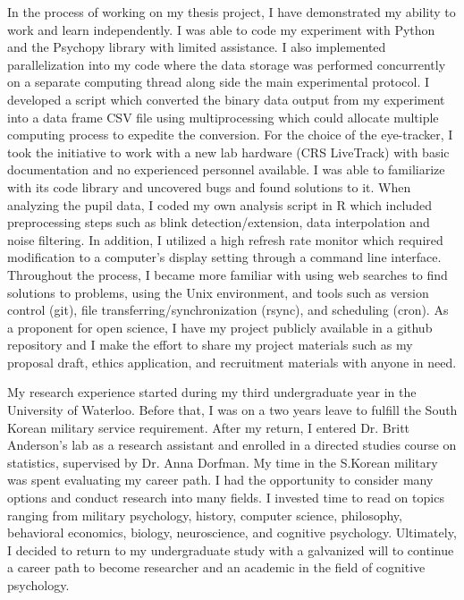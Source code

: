 In the process of working on my thesis project, I have demonstrated my ability to work and learn independently. I was able to code my experiment with Python and the Psychopy library with limited assistance. I also implemented parallelization into my code where the data storage was performed concurrently on a separate computing thread along side the main experimental protocol. I developed a script which converted the binary data output from my experiment into a data frame CSV file using multiprocessing which could allocate multiple computing process to expedite the conversion. For the choice of the eye-tracker, I took the initiative to work with a new lab hardware (CRS LiveTrack) with basic documentation and no experienced personnel available. I was able to familiarize with its code library and uncovered bugs and found solutions to it. When analyzing the pupil data, I coded my own analysis script in R which included preprocessing steps such as blink detection/extension, data interpolation and noise filtering. In addition, I utilized a high refresh rate monitor which required modification to a computer’s display setting through a command line interface. Throughout the process, I became more familiar with using web searches to find solutions to problems, using the Unix environment, and tools such as version control (git), file transferring/synchronization (rsync), and scheduling (cron). As a proponent for open science, I have my project publicly available in a github repository and I make the effort to share my project materials such as my proposal draft, ethics application, and recruitment materials with anyone in need.

My research experience started during my third undergraduate year in the University of Waterloo. Before that, I was on a two years leave to fulfill the South Korean military service requirement. After my return, I entered Dr. Britt Anderson’s lab as a research assistant and enrolled in a directed studies course on statistics, supervised by Dr. Anna Dorfman. My time in the S.Korean military was spent evaluating my career path. I had the opportunity to consider many options and conduct research into many fields. I invested time to read on topics ranging from military psychology, history, computer science, philosophy, behavioral economics, biology, neuroscience, and cognitive psychology. Ultimately, I decided to return to my undergraduate study with a galvanized will to continue a career path to become researcher and an academic in the field of cognitive psychology.

